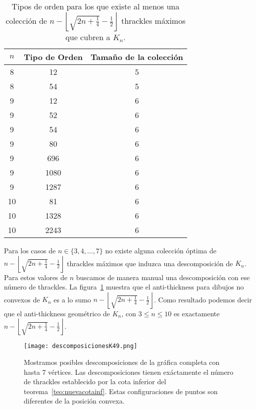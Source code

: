   \begin{table}[htbp]
    \centering
    \begin{tabular}{|c|c|c|}
      \hline
      $n$   & Tipo de Orden & Tamaño de la colección \\ \hline\hline
      8 & 12   & 5  \\
      8 & 54   & 5  \\ \hline
      9 & 12   & 6  \\
      9 & 52   & 6  \\
      9 & 54   & 6  \\
      9 & 80   & 6  \\
      9 & 696  & 6  \\
      9 & 1080 & 6  \\
      9 & 1287 & 6  \\ \hline
     10 & 81   & 6  \\
     10 & 1328 & 6  \\
     10 & 2243 & 6  \\ \hline
    \end{tabular}
    \caption{Tipos de orden para los que existe al menos una colección de
    $n -
    \left\lfloor\sqrt{2n+\frac{1}{4}} - \frac{1}{2}\right\rfloor$ thrackles máximos que cubren a $K_n$.}
    \label{table:res_desc_th_max}
  \end{table}

  Para los casos de $n \in \{3,4,\dots,7\}$ no existe alguna
  colección óptima de $n - \left\lfloor\sqrt{2n+\frac{1}{4}} -
  \frac{1}{2}\right\rfloor$ thrackles máximos que induzca una descomposición de
  $K_n$. Para estos valores de $n$ buscamos de manera manual una descomposición
  con ese número de thrackles. La figura~\ref{fig:descomposicionesk4_k9} muestra que el anti-thickness para dibujos no convexos de $K_n$ es a lo sumo $n - \left\lfloor\sqrt{2n+\frac{1}{4}} - \frac{1}{2}\right\rfloor$. Como resultado podemos decir que el anti-thickness geométrico de $K_n$, con $ 3\leq n \leq 10$ es exactamente $n - \left\lfloor\sqrt{2n+\frac{1}{4}} - \frac{1}{2}\right\rfloor$.

  \begin{figure}[htpb]
    \centering
    \texttt{[image: descomposicionesK49.png]}
    \caption{Mostramos posibles descomposiciones de la gráfica completa con
    hasta 7 vértices. Las descomposiciones tienen exáctamente el número de
    thrackles establecido por la cota inferior del
    teorema~\ref{teo:nuevacotainf}. Estas configuraciones de puntos son
    diferentes de la posición convexa.}
    \label{fig:descomposicionesk4_k9}
  \end{figure}

